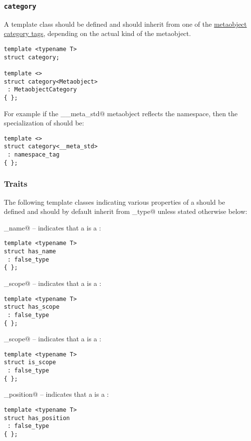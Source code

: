 \subsubsection{\texttt{category}}

A template class \verb@category@ should be defined and should inherit from
one of the \hyperref[metaobject-category-tags]{metaobject category tags}, depending on
the actual kind of the metaobject.

\begin{verbatim}
template <typename T>
struct category;

template <>
struct category<Metaobject>
 : MetaobjectCategory
{ };
\end{verbatim}

For example if the \verb@__meta_std@ metaobject reflects the \verb@std@ namespace,
then the specialization of \verb@category@ should be:

\begin{verbatim}
template <>
struct category<__meta_std>
 : namespace_tag
{ };
\end{verbatim}

\subsubsection{Traits}

The following template classes indicating various properties of a 
should be defined and should by default inherit from \verb@false_type@ unless stated
otherwise below:

\verb@has_name@ -- indicates that a  is a :
\begin{verbatim}
template <typename T>
struct has_name
 : false_type
{ };
\end{verbatim}

\verb@has_scope@ -- indicates that a  is a :
\begin{verbatim}
template <typename T>
struct has_scope
 : false_type
{ };
\end{verbatim}

\verb@is_scope@ -- indicates that a  is a :
\begin{verbatim}
template <typename T>
struct is_scope
 : false_type
{ };
\end{verbatim}

\verb@has_position@ -- indicates that a  is a :
\begin{verbatim}
template <typename T>
struct has_position
 : false_type
{ };
\end{verbatim}


